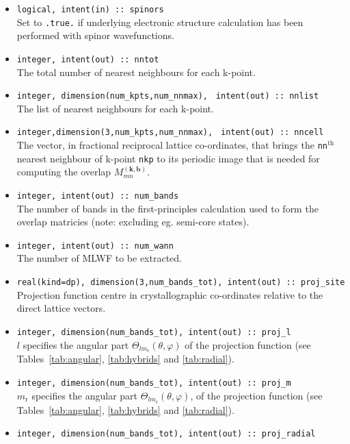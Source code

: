 \begin{itemize}
\item \verb#logical, intent(in) :: spinors#\\ Set to \texttt{.true.} if
  underlying electronic structure calculation has been performed with
  spinor wavefunctions.
\item \verb#integer, intent(out) :: nntot#\\ The
  total number of nearest neighbours for each k-point.
\item \verb#integer, dimension(num_kpts,num_nnmax),#
      \verb# intent(out) :: nnlist#\\
      The list of nearest neighbours for each k-point.
\item \verb#integer,dimension(3,num_kpts,num_nnmax),#
      \verb# intent(out) :: nncell#\\
      The vector, in fractional reciprocal lattice co-ordinates, that
      brings the \verb#nn#$^{\mathrm{th}}$ nearest neighbour of
      k-point \verb#nkp# to its periodic image that
      is needed for computing the overlap
      $M_{mn}^{(\mathbf{k,b})}$.
\item \verb#integer, intent(out) :: num_bands#\\ The number of bands in the
first-principles calculation used to form the overlap matricies (note: excluding eg. semi-core states).
\item \verb#integer, intent(out) :: num_wann#\\ The number of MLWF
  to be extracted.
\item  \verb#real(kind=dp), dimension(3,num_bands_tot), intent(out) :: proj_site# \\
Projection function centre
in crystallographic co-ordinates relative to the direct lattice
vectors.
\item \verb#integer, dimension(num_bands_tot), intent(out) :: proj_l#\\
 $l$  specifies the angular part $\Theta_{lm_{\mathrm{r}}}(\theta,\varphi)$ of the
projection function  (see Tables~\ref{tab:angular}, \ref{tab:hybrids}
and \ref{tab:radial}).
\item \verb#integer, dimension(num_bands_tot), intent(out) :: proj_m#\\
 $m_\mathrm{r}$ specifies the angular part $\Theta_{lm_{\mathrm{r}}}(\theta,\varphi)$, of the
projection function
 (see Tables~\ref{tab:angular}, \ref{tab:hybrids}
and \ref{tab:radial}).
\item \verb#integer, dimension(num_bands_tot), intent(out) :: proj_radial#\\

\end{itemize}

